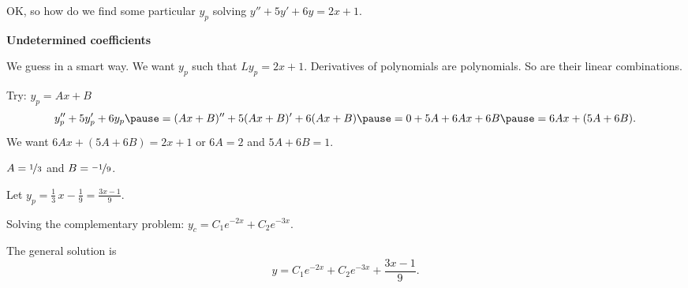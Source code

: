 \documentclass[10pt,aspectratio=169]{beamer}
\begin{document}
\begin{frame}
OK, so how do we find some particular $y_p$ solving
$y'' + 5y'+ 6y = 2x+1$.

\medskip
\pause

\textbf{Undetermined coefficients}

\medskip
\pause

We guess in a smart way.
We want $y_p$ such that $Ly_p = 2x+1$.
\pause
Derivatives of polynomials are polynomials.
\pause
So are their linear combinations.

\medskip
\pause

Try: \quad $y_p = Ax + B$
\pause
\[
y_p'' + 5y_p'+ 6y_p  \pause =
(Ax+B)'' + 5(Ax+B)' + 6(Ax+B)
\pause  = 
0 + 5A + 6Ax + 6B
\pause
= 6Ax+ (5A+6B) .
\]
\pause
We want \quad $6Ax+(5A+6B) = 2x+1$ \quad or \quad $6A=2$ and $5A+6B=1$.

\medskip
\pause

\thus \quad  $A = \nicefrac{1}{3}$ and $B = \nicefrac{-1}{9}$.

\medskip
\pause

Let \quad $\displaystyle y_p = \frac{1}{3}\, x - \frac{1}{9} = \frac{3x-1}{9}$.

\medskip
\pause

Solving the complementary problem:
\quad
$y_c = C_1 e^{-2x} + C_2 e^{-3x}$.

\medskip
\pause

The general solution is
\[
y = C_1 e^{-2x} + C_2 e^{-3x} + \frac{3x-1}{9} .
\]
\end{frame}
\end{document}
